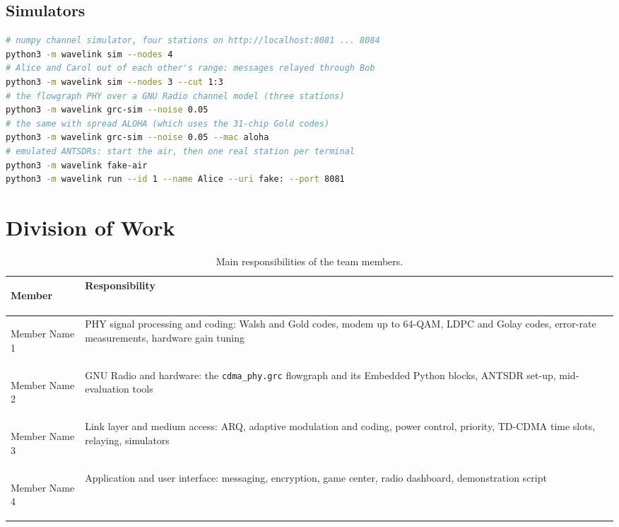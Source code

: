 \documentclass[11pt,a4paper,oneside]{report}
\newcommand{\MemberA}{Member Name 1}  \newcommand{\IndexA}{Index No.}
\newcommand{\MemberB}{Member Name 2}  \newcommand{\IndexB}{Index No.}
\newcommand{\MemberC}{Member Name 3}  \newcommand{\IndexC}{Index No.}
\newcommand{\MemberD}{Member Name 4}  \newcommand{\IndexD}{Index No.}
\newcommand{\code}[1]{\texttt{\small #1}}
\begin{document}
\section{Simulators}
\begin{lstlisting}[language=bash,basicstyle=\ttfamily\scriptsize]
# numpy channel simulator, four stations on http://localhost:8081 ... 8084
python3 -m wavelink sim --nodes 4
# Alice and Carol out of each other's range: messages relayed through Bob
python3 -m wavelink sim --nodes 3 --cut 1:3
# the flowgraph PHY over a GNU Radio channel model (three stations)
python3 -m wavelink grc-sim --noise 0.05
# the same with spread ALOHA (which uses the 31-chip Gold codes)
python3 -m wavelink grc-sim --noise 0.05 --mac aloha
# emulated ANTSDRs: start the air, then one real station per terminal
python3 -m wavelink fake-air
python3 -m wavelink run --id 1 --name Alice --uri fake: --port 8081
\end{lstlisting}

\chapter{Division of Work}\label{app:work}
\begin{table}[htbp]
\centering\small
\caption{Main responsibilities of the team members.}\label{tab:work}
\begin{tabularx}{\linewidth}{@{}>{\bfseries\raggedright\arraybackslash}p{38mm}L@{}}
\toprule
Member & Responsibility\\
\midrule
\MemberA & PHY signal processing and coding: Walsh and Gold codes, modem up to 64-QAM, LDPC and Golay codes, error-rate measurements, hardware gain tuning\\
\MemberB & GNU Radio and hardware: the \code{cdma\_phy.grc} flowgraph and its Embedded Python blocks, ANTSDR set-up, mid-evaluation tools\\
\MemberC & Link layer and medium access: ARQ, adaptive modulation and coding, power control, priority, TD-CDMA time slots, relaying, simulators\\
\MemberD & Application and user interface: messaging, encryption, game center, radio dashboard, demonstration script\\
\bottomrule
\end{tabularx}
\end{table}
\end{document}
